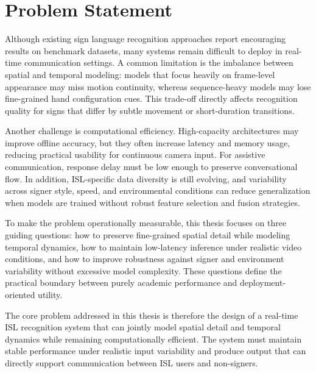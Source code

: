 \section{Problem Statement}
Although existing sign language recognition approaches report encouraging results on benchmark datasets, many systems remain difficult to deploy in real-time communication settings. A common limitation is the imbalance between spatial and temporal modeling: models that focus heavily on frame-level appearance may miss motion continuity, whereas sequence-heavy models may lose fine-grained hand configuration cues. This trade-off directly affects recognition quality for signs that differ by subtle movement or short-duration transitions.

Another challenge is computational efficiency. High-capacity architectures may improve offline accuracy, but they often increase latency and memory usage, reducing practical usability for continuous camera input. For assistive communication, response delay must be low enough to preserve conversational flow. In addition, ISL-specific data diversity is still evolving, and variability across signer style, speed, and environmental conditions can reduce generalization when models are trained without robust feature selection and fusion strategies.

To make the problem operationally measurable, this thesis focuses on three guiding questions: how to preserve fine-grained spatial detail while modeling temporal dynamics, how to maintain low-latency inference under realistic video conditions, and how to improve robustness against signer and environment variability without excessive model complexity. These questions define the practical boundary between purely academic performance and deployment-oriented utility.

The core problem addressed in this thesis is therefore the design of a real-time ISL recognition system that can jointly model spatial detail and temporal dynamics while remaining computationally efficient. The system must maintain stable performance under realistic input variability and produce output that can directly support communication between ISL users and non-signers.
